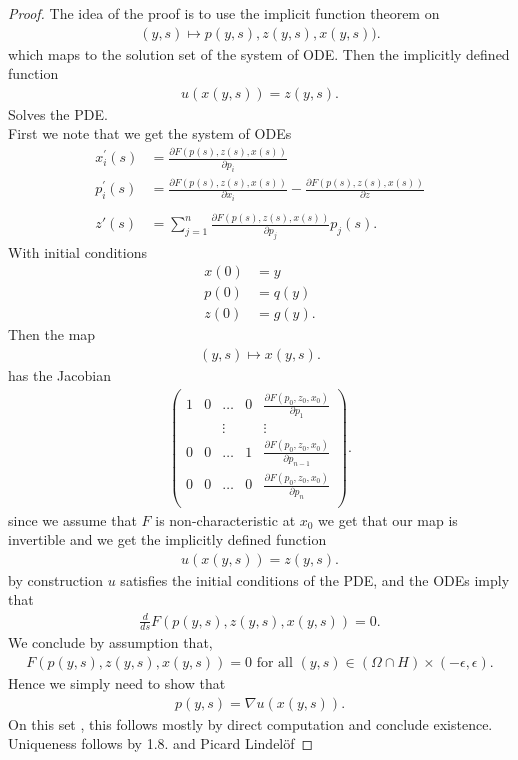 \begin{proof}
 The idea of the proof is to use the implicit function theorem on 
 \begin{align*}
   (y,s) \mapsto  p (y,s),z(y,s),x(y,s)) 
 .\end{align*}
 which maps to the solution set of the system of ODE.
 Then the implicitly defined function 
 \begin{align*}
  u(x(y,s)) = z(y,s)
 .\end{align*}
 Solves the PDE. \\[1ex]
First we note that we get the system of ODEs 
\begin{align*}
  x_i^{'}(s) &= \frac{\partial F(p(s),z(s),x(s))}{\partial p_i} \\
  p_i^{'}(s) &= \frac{\partial F(p(s),z(s),x(s))}{\partial x_i} - \frac{\partial F(p(s),z(s),x(s))}{\partial z} \\ \\
  z'(s)      &= \sum_{j=1}^{n} \frac{\partial F(p(s),z(s),x(s))}{\partial p_j}  p_j(s)
.\end{align*}
With initial conditions  
\begin{align*}
  x(0) &= y \\
  p(0) &= q(y) \\
  z(0) &= g(y)
.\end{align*}
Then the  map
\begin{align*}
  (y,s) \mapsto  x(y,s)
.\end{align*}
has the Jacobian 
\begin{align*}
  \begin{pmatrix} 
    1 & 0 & \ldots  & 0 & \frac{\partial F(p_{0},z_{0},x_{0})}{\partial p_{1}} \\
     &  & \vdots  &  & \vdots \\
    0 & 0 & \ldots  & 1 & \frac{\partial F(p_{0},z_{0},x_{0})}{\partial p_{n-1}} \\
    0 & 0 & \ldots  & 0 & \frac{\partial F(p_{0},z_{0},x_{0})}{\partial p_{n}} \\
  \end{pmatrix} 
.\end{align*}
since we assume that $F$ is non-characteristic at $x_{0}$ we get that our map is invertible and we get the implicitly defined function
\begin{align*}
  u(x(y,s)) = z(y,s)
.\end{align*}
by construction $u$ satisfies the initial conditions  of the PDE, and the ODEs imply that 
\begin{align*}
  \frac{d}{ds} F(p(y,s),z(y,s),x(y,s)) = 0
.\end{align*}
We conclude by assumption that,
\begin{align*}
  F(p(y,s),z(y,s),x(y,s)) = 0 \text{ for all } (y,s) \in  (\Omega  \cap H) \times  (-\epsilon,\epsilon)
.\end{align*}
Hence we simply need to show that 
\begin{align*}
  p(y,s) = \nabla u (x(y,s))
.\end{align*}
On this set , this follows mostly by direct computation and conclude existence. \\[1ex]
Uniqueness follows by 1.8. and Picard Lindelöf
\end{proof}
